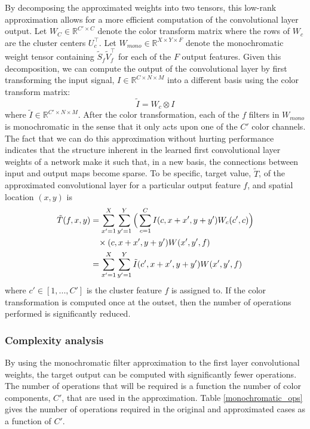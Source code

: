 By decomposing the approximated weights into two tensors, this low-rank approximation allows for a more efficient computation of the convolutional layer output. Let $W_C \in \mathbb{R}^{C' \times C}$ denote the color transform matrix where the rows of $W_c$ are the cluster centers $U_c^{\top}$. Let $W_{mono} \in \mathbb{R}^{X \times Y \times F}$ denote the monochromatic weight tensor containing $ \tilde{S}_f \tilde{V}_f^{\top}$ for each of the $F$ output features. Given this decomposition, we can compute the output of the convolutional layer by first transforming the input signal, $I \in \mathbb{R}^{C \times N \times M}$ into a different basis using the color transform matrix: 
\begin{equation*}
	\tilde{I} = W_c \otimes I
\end{equation*}
where $\tilde{I} \in \mathbb{R}^{C' \times N \times M}$. After the color transformation, each of the $f$ filters in $W_{mono}$ is monochromatic in the sense that it only acts upon one of the $C'$ color channels. The fact that we can do this approximation without hurting performance indicates that the structure inherent in the learned first convolutional layer weights of a network make it such that, in a new basis, the connections between input and output maps become sparse. To be specific, target value, $\tilde{T}$, of the approximated convolutional layer for a particular output feature $f$, and spatial location $(x, y)$ is
\begin{align*}
	\tilde{T}(f, x, y) &= \sum_{x' = 1}^{X} \sum_{y' = 1}^{Y} \Big(\sum_{c = 1}^{C} I(c, x + x', y + y') W_c(c', c) \Big) \\
			&\hspace{3mm} \times (c, x + x', y + y') W(x', y', f) \\
			&= \sum_{x' = 1}^{X} \sum_{y' = 1}^{Y} \tilde{I}(c', x + x', y + y') W(x', y', f)
\end{align*} 
where $c' \in [1, ..., C']$ is the cluster feature $f$ is assigned to. If the color transformation is computed once at the outset, then the number of operations performed is significantly reduced.  

\subsubsection{Complexity analysis}
By using the monochromatic filter approximation to the first layer convolutional weights, the target output can be computed with significantly fewer operations. The number of operations that will be required is a function the number of color components, $C'$, that are used in the approximation. Table \ref{monochromatic_ops} gives the number of operations required in the original and approximated cases as a function of $C'$. 

